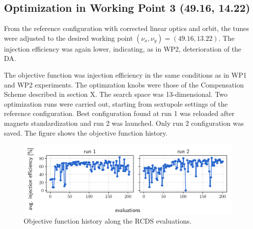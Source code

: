 \subsection{Optimization in Working Point 3 (49.16, 14.22)}
From the reference configuration with corrected linear optics and orbit, the tunes were adjusted to the desired working point $(\nu_x, \nu_y)=(49.16, 13.22)$. The injection efficiency was again lower, indicating, as in WP2, deterioration of the DA.

The objective function was injection efficiency in the same conditions as in WP1 and WP2 experiments. The optimzation knobs were those of the Compensation Scheme described in section X. The search space was 13-dimensional. Two optimization runs were carried out, starting from sextupole settings of the reference configuration. Best configuration found at run 1 was reloaded after magnets standardization and run 2 was launched. Only run 2 configuration was saved. The figure shows the objective function history.
\begin{figure}[tb]
    \centering
    \includegraphics[width=\columnwidth]{Images/wp3_objfunc_hist.pdf}
    \caption{Objective function history along the RCDS evaluations.}
\end{figure}
